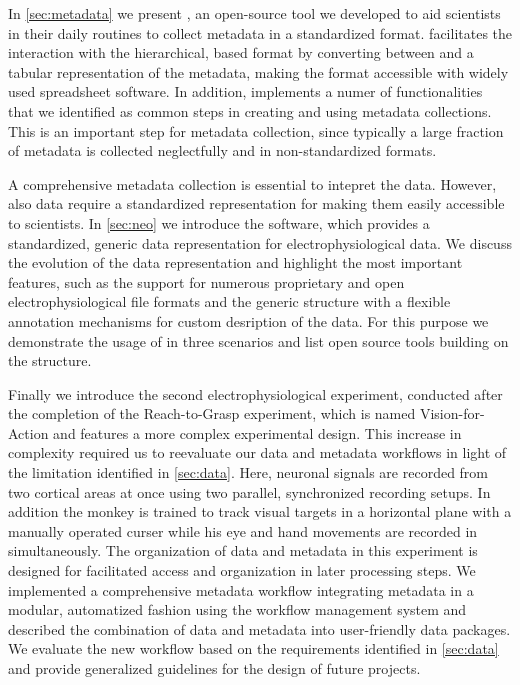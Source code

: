 In \cref{sec:metadata} we present , an open-source tool we developed to aid scientists in their daily routines to collect metadata in a standardized format.  facilitates the interaction with the hierarchical,  based  format by converting between  and a tabular representation of the metadata, making the  format accessible with widely used spreadsheet software. In addition,  implements a numer of functionalities that we identified as common steps in creating and using metadata collections. This is an important step for metadata collection, since typically a large fraction of metadata is collected neglectfully and in non-standardized formats.

A comprehensive metadata collection is essential to intepret the data. However, also data require a standardized representation for making them easily accessible to scientists. In \cref{sec:neo} we introduce the  software, which provides a standardized, generic data representation for electrophysiological data. We discuss the evolution of the  data representation and highlight the most important features, such as the support for numerous proprietary and open electrophysiological file formats and the generic structure with a flexible annotation mechanisms for custom desription of the data. For this purpose we demonstrate the usage of  in three scenarios and list open source tools building on the  structure.

Finally we introduce the second electrophysiological experiment, conducted after the completion of the Reach-to-Grasp experiment, which is named Vision-for-Action and features a more complex experimental design. This increase in complexity required us to reevaluate our data and metadata workflows in light of the limitation identified in \cref{sec:data}. Here, neuronal signals are recorded from two cortical areas at once using two parallel, synchronized recording setups. In addition the monkey is trained to track visual targets in a horizontal plane with a manually operated curser while his eye and hand movements are recorded in simultaneously. The organization of data and metadata in this experiment is designed for facilitated access and organization in later processing steps. We implemented a comprehensive metadata workflow integrating metadata in a modular, automatized fashion using the  workflow management system and described the combination of data and metadata into user-friendly data packages. We evaluate the new workflow based on the requirements identified in \cref{sec:data} and provide generalized guidelines for the design of future projects.

